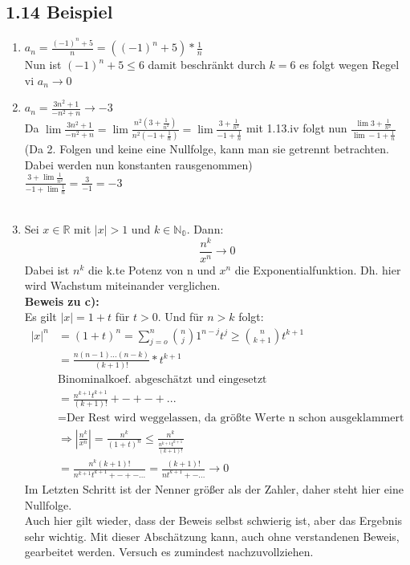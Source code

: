 \documentclass[12pt]{article}
\begin{document}
\subsection*{1.14 Beispiel}

\begin{enumerate}[\bfseries a)]
	\item $a_n=\frac{(-1)^n + 5}{n} = ((-1)^n + 5) * \frac{1}{n}$\\
	Nun ist $(-1)^n +5 \leq 6$ damit beschränkt durch $k=6$ es folgt wegen Regel vi $a_n \rightarrow 0$\\
	\item $a_n = \frac{3n^2 +1}{-n^2 +n} \rightarrow -3$\\
	Da $\lim \frac{3n^2 +1}{-n^2 +n} = \lim \frac{n^2(3+\frac{1}{n^2})}{n^2(-1+\frac{1}{n})} = \lim \frac{3+\frac{1}{n^2}}{-1+\frac{1}{n}}$ mit 1.13.iv folgt nun $\frac{\lim 3+\frac{1}{n^2}}{\lim -1 + \frac{1}{n}}$ \\(Da 2. Folgen und keine eine Nullfolge, kann man sie getrennt betrachten. Dabei werden nun konstanten rausgenommen)\\
	$\frac{3 + \lim \frac{1}{n^2}}{-1 +\lim \frac{1}{n}} = \frac{3}{-1}=-3$\\
	\\
	\item Sei $x \in \mathbb{R}$ mit $|x| > 1$ und $k \in \mathbb{N_0}$. Dann:
	$$ \frac{n^k}{x^n} \rightarrow 0$$
	Dabei ist $n^k$ die k.te Potenz von n und $x^n$ die Exponentialfunktion. Dh. hier wird Wachstum miteinander verglichen. \\
	\textbf{Beweis zu c):} \\
	Es gilt $|x| = 1+t$ für $t>0$. Und für $n> k$ folgt:
	\begin{align*}
	|x|^n &= (1+t)^n = \sum_{j=o}^{n} \binom{n}{j} 1^{n-j} t^j \geq \binom{n}{k+1} t^{k+1}\\
	&= \frac{n(n-1)...(n-k)}{(k+1)!} *t^{k+1}\\
	&\text{Binominalkoef. abgeschätzt und eingesetzt}\\
	&= \frac{n^{k+1} t^{k+1}}{(k+1)!}+-+-+...\\
	&= \text{Der Rest wird weggelassen, da größte Werte n schon ausgeklammert}\\
	&\Rightarrow |\frac{n^k}{x^n}| = \frac{n^k}{(1+t)^n} \leq \frac{n^k}{\frac{n^{k+1}t^{k+1}}{(k+1)!}} \\
	&= \frac{n^k (k+1)!}{n^{k+1}t^{k+1}+-+-...} = \frac{(k+1)!}{nt^{k+1}+-...} \rightarrow 0
	\end{align*}
	Im Letzten Schritt ist der Nenner größer als der Zahler, daher steht hier eine Nullfolge.\\
	Auch hier gilt wieder, dass der Beweis selbst schwierig ist, aber das Ergebnis sehr wichtig. Mit dieser Abschätzung kann, auch ohne verstandenen Beweis, gearbeitet werden. Versuch es zumindest nachzuvollziehen. \\
	

\end{enumerate}
\end{document}
